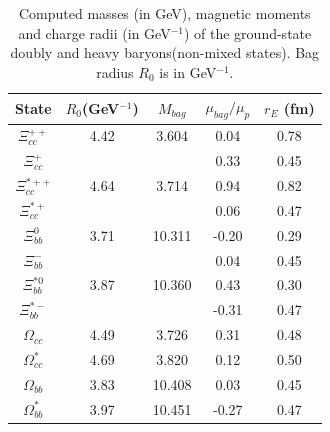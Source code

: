 \documentclass[12pt,prd,onecolumn,floatfix,nofootinbib]{revtex4}
\begin{document}
\renewcommand{\tabcolsep}{0.51cm} \renewcommand{\arraystretch}{1.1}
\begin{table}[!htb]
\setlength{\abovecaptionskip}{0.5cm}
\caption{Computed masses (in GeV), magnetic moments and charge radii (in
GeV$^{-1}$) of the ground-state doubly and heavy baryons(non-mixed states). Bag
radius $R_{0}$ is in GeV$^{-1}$.}
\label{tab:2heavybaryon}%
\begin{tabular}{ccccc}
\hline\hline
\textrm{State} & $R_{0}$(GeV$^{-1}$) & $M_{bag}$ & $\mu_{bag}/\mu_{p}$ & $r_{E}$ (fm) \\ \hline
$\Xi_{cc}^{++}$ & 4.42 & 3.604 & 0.04 & 0.78 \\
$\Xi_{cc}^{+}$ &  &  & 0.33 & 0.45 \\
$\Xi_{cc}^{\ast ++}$ & 4.64 & 3.714 & 0.94 & 0.82 \\
$\Xi_{cc}^{\ast +}$ &  &  & 0.06 & 0.47 \\
$\Xi_{bb}^{0}$ & 3.71 & 10.311 & -0.20 & 0.29 \\
$\Xi_{bb}^{-}$ &  &  & 0.04 & 0.45 \\
$\Xi_{bb}^{\ast 0}$ & 3.87 & 10.360 & 0.43 & 0.30 \\
$\Xi_{bb}^{\ast -}$ &  &  & -0.31 & 0.47 \\
$\Omega_{cc}$ & 4.49 & 3.726 & 0.31 & 0.48 \\
$\Omega_{cc}^{\ast}$ & 4.69 & 3.820 & 0.12 & 0.50 \\
$\Omega_{bb}$ & 3.83 & 10.408 & 0.03 & 0.45 \\
$\Omega_{bb}^{\ast}$ & 3.97 & 10.451 & -0.27 & 0.47 \\ \hline\hline
\end{tabular}%
\end{table}
\end{document}
